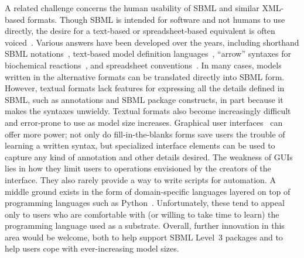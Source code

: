 \documentclass{sbml-paper}
\begin{document}
A related challenge concerns the human usability of SBML and similar XML-based formats.  Though SBML is intended for software and not humans to use directly, the desire for a text-based or spreadsheet-based equivalent is often voiced~\citep[e.g.,][]{Kirouac2019reproducibility}.  Various answers have been developed over the years, including shorthand SBML notations~\citep{Gillespie2006tools}, text-based model definition languages~\citep[e.g.,][]{Smith2009antimony}, ``arrow'' syntaxes for biochemical reactions~\citep{Shapiro2016pycellerator}, and spreadsheet conventions~\citep{Lubitz2016sbtab}.  In many cases, models written in the alternative formats can be translated directly into SBML form.  However, textual formats lack features for expressing all the details defined in SBML, such as annotations and SBML package constructs, in part because it makes the syntaxes unwieldy.  Textual formats also become increasingly difficult and error-prone to use as model size increases.  Graphical user interfaces~\citep[e.g.,][]{Funahashi2003celldesignera} can offer more power; not only do fill-in-the-blanks forms save users the trouble of learning a written syntax, but specialized interface elements can be used to capture any kind of annotation and other details desired.  The weakness of GUIs lies in how they limit users to operations envisioned by the creators of the interface.  They also rarely provide a way to write scripts for automation.  A middle ground exists in the form of domain-specific languages layered on top of programming languages such as Python~\citep[e.g.,][]{Choi2018tellurium, olivier2005modelling, Lopez2013programming}.  Unfortunately, these tend to appeal only to users who are comfortable with (or willing to take time to learn) the programming language used as a substrate.  Overall, further innovation in this area would be welcome, both to help support SBML Level~3 packages and to help users cope with ever-increasing model sizes.
\end{document}
